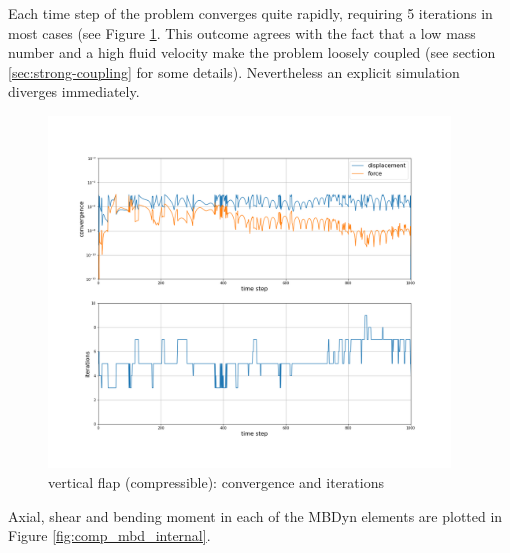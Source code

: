 Each time step of the problem converges quite rapidly, requiring 5 iterations in most cases (see Figure \ref{fig:comp_mbd_iter}. This outcome agrees with the fact that a low mass number and a high fluid velocity make the problem loosely coupled (see section \ref{sec:strong-coupling} for some details). Nevertheless an explicit simulation diverges immediately.  


\begin{figure}[htbp!]
	\centering
	\includegraphics[width=0.95\textwidth, trim=0 80 0 100, clip]{images/comp_flap/MBD_iterations_comp.png}
	\caption{vertical flap (compressible): convergence and iterations}
	\label{fig:comp_mbd_iter}
\end{figure}

Axial, shear and bending moment in each of the MBDyn elements are plotted in Figure \ref{fig:comp_mbd_internal}.

